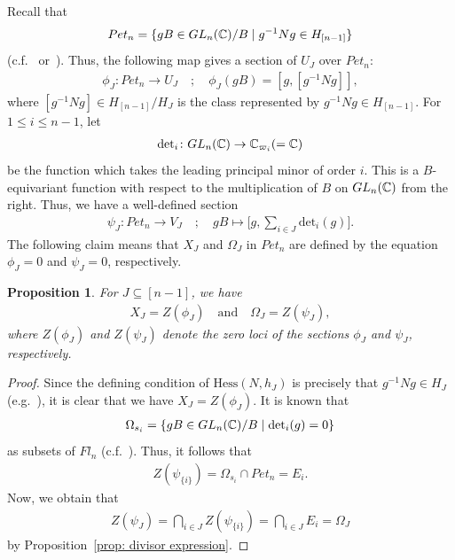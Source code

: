 \documentclass[11pt]{article}
\newtheorem{prop}[theo]{Proposition}
\theoremstyle{definition}
\numberwithin{equation}{section}
\numberwithin{equation}{section}
\begin{document}
Recall that 
\begin{align*}
Pet_{n} = \{gB \in {\rm GL}_n({\mathbb C})/B \mid g^{-1}Ng\in H_{[n-1]}\}
\end{align*}
(c.f.~\cite{Insko-Tymoczko,Rietsch06} or~\cite[Sect.~2]{ty}).
Thus, the following map gives a section of $U_{J}$ over $Pet_{n}$:
\begin{align*}
\phi_J \colon  Pet_{n} \rightarrow U_{J}
\quad ; \quad 
\phi_J(gB) = [g, [g^{-1}Ng]],
\end{align*}
where $[g^{-1}Ng]\in H_{[n-1]}/H_J$ is the class represented by $g^{-1}Ng \in H_{[n-1]}$. For $1\le i\le n-1$, let 
\begin{align*}
\text{det}_i \colon {\rm GL}_n({\mathbb C})\rightarrow {\mathbb C}_{\varpi_i}(={\mathbb C})
\end{align*} 
be the function which takes the leading principal minor of order $i$. This is a $B$-equivariant function with respect to the multiplication of $B$ on ${\rm GL}_n({\mathbb C})$ from the right. Thus, we have a well-defined section 
\begin{align*}
\psi_J \colon  Pet_{n} \rightarrow V_J
\quad ; \quad
gB\mapsto \Big[g,\sum_{i\in J}\text{det}_i(g)\Big].
\end{align*}
The following claim means that $X_J$ and $\Omega_J$ in $Pet_{n}$ are defined by the equation $\phi_J=0$ and $\psi_J=0$, respectively.

\begin{prop}\label{prop: zero locus}
For $J\subseteq[n-1]$, we have 
\begin{align*}
 X_J=Z(\phi_J) \quad \text{and} \quad \Omega_J =Z(\psi_J) ,
\end{align*}
where $Z(\phi_J)$ and $Z(\psi_J)$ denote the zero loci of the sections $\phi_J$ and $\psi_J$, respectively.
\end{prop}

\begin{proof}
Since the defining condition of $\text{Hess}(N,h_{J})$ is precisely that $g^{-1}Ng\in H_{J}$ (e.g.~\cite[Sect.~2]{ty}), it is clear that we have $X_J=Z(\phi_J)$. It is known that 
\begin{align*}
\Omega_{s_i} = \{gB \in {\rm GL}_n({\mathbb C})/B \mid \text{det}_i(g)=0\}
\end{align*}
as subsets of $Fl_n$ (c.f.~\cite[Proposition~9 in Sect.~10.6]{fult97}). Thus, it follows that
\begin{align*}
Z(\psi_{\{i\}}) = \Omega_{s_i}\cap Pet_{n}=E_i.
\end{align*}
Now, we obtain that
\begin{align*}
Z(\psi_J) = \bigcap_{i\in J} Z(\psi_{\{i\}}) = \bigcap_{i\in J} E_i = \Omega_{J}
\end{align*}
by Proposition~\ref{prop: divisor expression}.
\end{proof}
\end{document}

